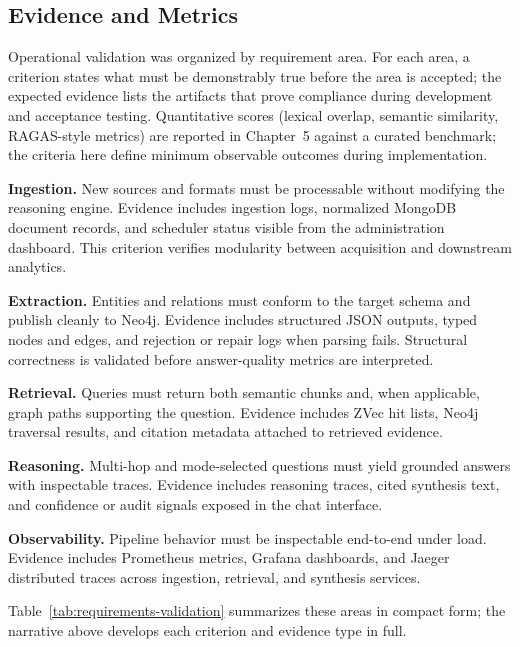 \subsection{Evidence and Metrics}

Operational validation was organized by requirement area. For each area, a criterion states what must be demonstrably true before the area is accepted; the expected evidence lists the artifacts that prove compliance during development and acceptance testing. Quantitative scores (lexical overlap, semantic similarity, RAGAS-style metrics) are reported in Chapter~5 against a curated benchmark; the criteria here define minimum observable outcomes during implementation.

\textbf{Ingestion.} New sources and formats must be processable without modifying the reasoning engine. Evidence includes ingestion logs, normalized MongoDB document records, and scheduler status visible from the administration dashboard. This criterion verifies modularity between acquisition and downstream analytics.

\textbf{Extraction.} Entities and relations must conform to the target schema and publish cleanly to Neo4j. Evidence includes structured JSON outputs, typed nodes and edges, and rejection or repair logs when parsing fails. Structural correctness is validated before answer-quality metrics are interpreted.

\textbf{Retrieval.} Queries must return both semantic chunks and, when applicable, graph paths supporting the question. Evidence includes ZVec hit lists, Neo4j traversal results, and citation metadata attached to retrieved evidence.

\textbf{Reasoning.} Multi-hop and mode-selected questions must yield grounded answers with inspectable traces. Evidence includes reasoning traces, cited synthesis text, and confidence or audit signals exposed in the chat interface.

\textbf{Observability.} Pipeline behavior must be inspectable end-to-end under load. Evidence includes Prometheus metrics, Grafana dashboards, and Jaeger distributed traces across ingestion, retrieval, and synthesis services.

Table~\ref{tab:requirements-validation} summarizes these areas in compact form; the narrative above develops each criterion and evidence type in full.

